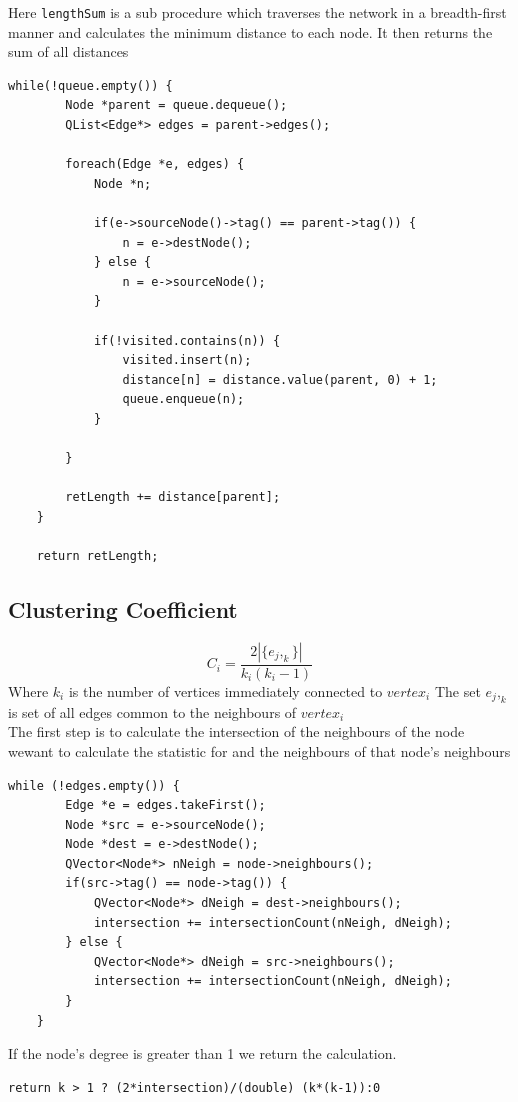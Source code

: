 \documentclass[a4paper,11pt,titlepage]{article}
\newcommand{\code}[1]{\texttt{#1}}
\begin{document}
Here \code{lengthSum} is a sub procedure which traverses the network in a
breadth-first manner and calculates the minimum distance to each node.
It then returns the sum of all distances
\begin{lstlisting}
while(!queue.empty()) {
        Node *parent = queue.dequeue();
        QList<Edge*> edges = parent->edges();

        foreach(Edge *e, edges) {
            Node *n;

            if(e->sourceNode()->tag() == parent->tag()) {
                n = e->destNode();
            } else {
                n = e->sourceNode();
            }

            if(!visited.contains(n)) {
                visited.insert(n);
                distance[n] = distance.value(parent, 0) + 1;
                queue.enqueue(n);
            }

        }

        retLength += distance[parent];
    }

    return retLength;
\end{lstlisting}

\subsection{Clustering Coefficient}
\[
C_i = \frac{2|\{e_j,_k\}|}{k_i(k_i-1)}
\]
Where $k_i$ is the number of vertices immediately connected to $vertex_i$
\newline
The set ${e_j,_k}$ is set of all edges common to the neighbours of $vertex_i$\\

The first step is to calculate the intersection of the neighbours of the node wewant to calculate the statistic for and the neighbours of that node's neighbours\begin{lstlisting}
while (!edges.empty()) {
        Edge *e = edges.takeFirst();
        Node *src = e->sourceNode();
        Node *dest = e->destNode();
        QVector<Node*> nNeigh = node->neighbours();
        if(src->tag() == node->tag()) {
            QVector<Node*> dNeigh = dest->neighbours();
            intersection += intersectionCount(nNeigh, dNeigh);
        } else {
            QVector<Node*> dNeigh = src->neighbours();
            intersection += intersectionCount(nNeigh, dNeigh);
        }
    }
\end{lstlisting}
If the node's degree is greater than 1 we return the calculation.
\begin{lstlisting}
return k > 1 ? (2*intersection)/(double) (k*(k-1)):0
\end{lstlisting}
\end{document}
